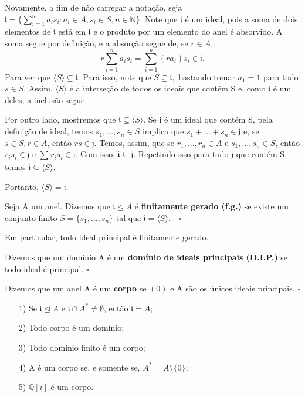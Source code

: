 \documentclass[algebraII_notes.tex]{subfiles}
\begin{document}
\begin{proof*}
	Novamente, a fim de não carregar a notação, seja \(\mathfrak{i} = \{\sum\limits_{i=1}^{n}a_{i}s_{i}: a_{i}\in A, s_{i}\in S, n\in \mathbb{N}\}\). Note que
	\(\mathfrak{i}\) é um ideal, pois a soma de dois elementos de \(\mathfrak{i}\) está em \(\mathfrak{i}\) e o produto por um elemento do anel é absorvido.
	A soma segue por definição, e a absorção segue de, se \(r\in A,\)
	\[
		r \sum\limits_{i=1}^{n}a_{i}s_{i} = \sum\limits_{i=1}^{n}(ra_{i})s_{i}\in \mathfrak{i}.
	\]
	Para ver que \(\langle S \rangle \subseteq{\mathfrak{i}}.\) Para isso, note que \(S\subseteq{\mathfrak{i}},\) bastando tomar \(a_{1} = 1\) para todo
	\(s\in S\). Assim, \(\langle S \rangle\) é a interseção de todos os ideais que contém S e, como \(\mathfrak{i}\) é um deles, a inclusão segue.

	Por outro lado, mostremos que \(\mathfrak{i}\subseteq{\langle S \rangle}.\) Se \(\mathfrak{j}\) é um ideal que contém S, pela definição de ideal,
	temos \(s_{1}, \dotsc, s_{n}\in S\) implica que \(s_{1} + \dotsc + s_{n}\in \mathfrak{j}\) e, se \(s\in S, r\in A\), então \(rs\in \mathfrak{j}.\)
	Temos, assim, que se \(r_{1}, \dotsc, r_{n}\in A\) e \(s_{1}, \dotsc, s_{n}\in S\), então \(r_{i}s_{i}\in \mathfrak{j}\) e \(\sum\limits_{}^{}r_{i}s_{i}\in \mathfrak{j}.\)
	Com isso, \(\mathfrak{i}\subseteq{\mathfrak{j}}.\) Repetindo isso para todo \(\mathfrak{j}\) que contém S, temos \(\mathfrak{i}\subseteq{\langle S \rangle}.\)

	Portanto, \(\langle S \rangle = \mathfrak{i}.\) \qedsymbol
\end{proof*}
\begin{def*}
	Seja A um anel. Dizemos que \(\mathfrak{i} \trianglelefteq{A}\) é \textbf{finitamente gerado (f.g.)} se existe um conjunto finito
	\(S = \{s_{1}, \dotsc, s_{n}\}\) tal que \(\mathfrak{i} = \langle S \rangle.\quad\square\)
\end{def*}
Em particular, todo ideal principal é finitamente gerado.
\begin{def*}
	Dizemos que um domínio A é um \textbf{domínio de ideais principais (D.I.P.)} se todo ideal é principal. \(\square\)
\end{def*}
\begin{def*}
	Dizemos que um anel A é um \textbf{corpo} se \((0)\) e A são os únicos ideais principais. \(\square\)
\end{def*}
\begin{example}[Exercício]
	\begin{itemize}
		\item[1)] Se \(\mathfrak{i}\trianglelefteq{A}\) e \(\mathfrak{i}\cap A^{*}\neq\emptyset\), então \(\mathfrak{i} = A\);
		\item[2)] Todo corpo é um domínio;
		\item[3)] Todo domínio finito é um corpo;
		\item[4)] A é um corpo se, e somente se, \(A^{*} = A \setminus{\{0\}}\);
		\item[5)] \(\mathbb{Q}[i]\) é um corpo.
	\end{itemize}
\end{example}
\end{document}

